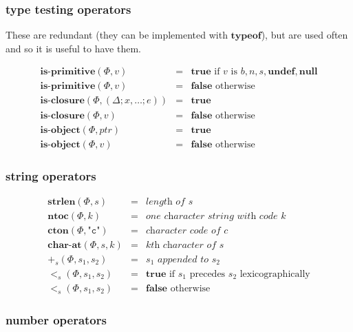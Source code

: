 \documentclass[draft, 10pt]{article}
\newcommand{\expr}[0]{e}
\newcommand{\var}[0]{x}
\newcommand{\bool}[0]{b}
\newcommand{\num}[0]{n}
\newcommand{\intg}[0]{k}
\newcommand{\str}[0]{s}
\newcommand{\undef}[0]{\textbf{undef}}
\newcommand{\nul}[0]{\textbf{null}}
\newcommand{\true}[0]{\textbf{true}}
\newcommand{\false}[0]{\textbf{false}}
\newcommand{\optypeof}[0]{\textbf{typeof}}
\newcommand{\opstrlen}[0]{\textbf{strlen}}
\newcommand{\opisprim}[0]{\textbf{is-primitive}}
\newcommand{\opisclosure}[0]{\textbf{is-closure}}
\newcommand{\opisobject}[0]{\textbf{is-object}}
\newcommand{\opntoc}[0]{\textbf{ntoc}}
\newcommand{\opcton}[0]{\textbf{cton}}
\newcommand{\opcharat}[0]{\textbf{char-at}}
\newcommand{\opstrplus}[0]{+_{\str}}
\newcommand{\opstrlt}[0]{<_{\str}}
\newcommand{\varenv}[0]{\Delta}
\newcommand{\heap}[0]{\Phi}
\newcommand{\closure}[3]{(#1; #2; #3)}
\newcommand{\bigval}[0]{v}
\newcommand{\heapptr}{ptr}
\newcommand{\rununop}[3]{#1(#2,#3)}
\newcommand{\runbinop}[4]{#1(#2,#3,#4)}
\begin{document}
\subsubsection{type testing operators}

These are redundant (they can be implemented with $\optypeof$), 
but are used often and so it is useful to have them.

\[
\begin{array}{rcl}
\rununop{\opisprim}{\heap}{\bigval} &=& \true \textrm{ if $\bigval$ is $\bool, \num, \str, \undef, \nul$} \\
\rununop{\opisprim}{\heap}{\bigval} &=& \false \textrm{ otherwise} \\
\rununop{\opisclosure}{\heap}{\closure{\varenv}{\var, \dots}{\expr}} &=& \true \\
\rununop{\opisclosure}{\heap}{\bigval} &=& \false \textrm{ otherwise} \\
\rununop{\opisobject}{\heap}{\heapptr} &=& \true \\
\rununop{\opisobject}{\heap}{\bigval} &=& \false \textrm{ otherwise} 
\end{array}
\]

\subsubsection{string operators}

\[
\begin{array}{rcl}
\rununop{\opstrlen}{\heap}{\str} &=& \textit{length of $\str$} \\
\rununop{\opntoc}{\heap}{\intg} &=& \textit{one character string with code $\intg$}\\
\rununop{\opcton}{\heap}{\texttt{"c"}} &=& \textit{character code of c} \\
\runbinop{\opcharat}{\heap}{\str}{\intg} &=& \textit{$\intg$th character of $\str$} \\
\runbinop{\opstrplus}{\heap}{\str_1}{\str_2} &=& \str_1 \textit{ appended to } \str_2 \\
\runbinop{\opstrlt}{\heap}{\str_1}{\str_2} &=& \true \textrm{ if $\str_1$ precedes $\str_2$ lexicographically} \\
\runbinop{\opstrlt}{\heap}{\str_1}{\str_2} &=& \false \textrm{ otherwise} 
\end{array}
\]

\subsubsection{number operators}
\end{document}
